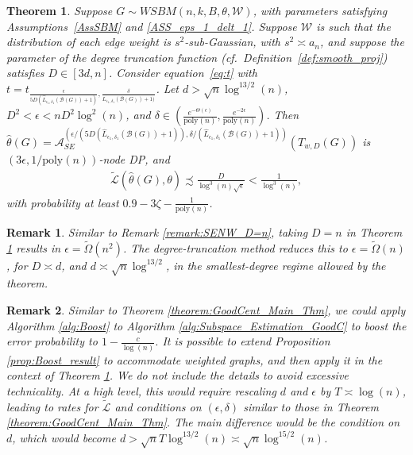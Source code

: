 \documentclass{article}
\newtheorem{remark}{Remark}
\newtheorem{theorem}{Theorem}
\newcommand{\thetahat}{\ensuremath{\widehat{\theta}}}
\begin{document}
\begin{theorem}
\label{theorem:GoodCent_Main_Thm_Weighted}
Suppose $G \sim WSBM(n, k, B, \theta, \mathscr{W})$, with parameters satisfying Assumptions~\ref{AssSBM} and \ref{ASS_eps_1_delt_1}. Suppose $\mathscr{W}$ is such that the distribution of each edge weight is $s^2$-sub-Gaussian, with $s^2 \asymp a_n$, and suppose the parameter of the degree truncation function (cf.\ Definition~\ref{def:smooth_proj}) satisfies $D \in [3d, n]$. Consider equation~\eqref{eq:t} with $t = t_{\frac{\epsilon}{5D(\hat{L}_{\epsilon_1, \delta_1}(\mathcal{B}(G)) + 1)}, \frac{\delta}{\hat{L}_{\epsilon_1, \delta_1}(\mathcal{B}(G)) + 1)}}$. Let $d > \sqrt{n}\log^{13/2}(n)$, $D^2 < \epsilon < nD^2\log^2(n)$, and $\delta \in \left(\frac{e^{-\Theta(\epsilon)}}{\mathrm{poly}(n)}, \frac{e^{-2\epsilon}}{\mathrm{poly}(n)}\right)$. Then $\thetahat(G) = \mathcal{A}_{SE}^{(\epsilon/(5D(\hat{L}_{\epsilon_1, \delta_1}(\mathcal{B}(G)) + 1)), \delta/(\hat{L}_{\epsilon_1, \delta_1}(\mathcal{B}(G)) + 1))}(T_{w,D}(G))$ is $(3\epsilon, 1/\mathrm{poly}(n))$-node DP, and
\begin{align*}
\widetilde{\mathcal{L}}\left(\thetahat(G), \theta\right) \precsim \frac{D}{\log^3(n)\sqrt{\epsilon}} < \frac{1}{\log^3(n)},
\end{align*}
with probability at least $0.9 - 3\zeta - \frac{1}{\mathrm{poly}(n)}$.
\end{theorem}

\begin{remark}
\label{remark:SEW_D=n}
Similar to Remark \ref{remark:SENW_D=n}, taking $D = n$ in Theorem \ref{theorem:GoodCent_Main_Thm_Weighted} results in $\epsilon = \widetilde{\Omega}(n^2)$. The degree-truncation method reduces this to $\epsilon = \widetilde{\Omega}(n)$, for $D \asymp d$, and $d \asymp \sqrt{n}\log^{13/2}$, in the smallest-degree regime allowed by the theorem.
\end{remark}

\begin{remark}
\label{remark:weighted_boost}
Similar to Theorem \ref{theorem:GoodCent_Main_Thm}, we could apply Algorithm \ref{alg:Boost} to Algorithm \ref{alg:Subspace_Estimation_GoodC} to boost the error probability to $1 - \frac{c}{\log(n)}$. It is possible to extend Proposition \ref{prop:Boost_result} to accommodate weighted graphs, and then apply it in the context of Theorem \ref{theorem:GoodCent_Main_Thm_Weighted}. We do not include the details to avoid excessive technicality. At a high level, this would require rescaling $d$ and $\epsilon$ by $T \asymp \log(n)$, leading to rates for $\widetilde{\mathcal{L}}$ and conditions on $(\epsilon,\delta)$ similar to those in Theorem \ref{theorem:GoodCent_Main_Thm}. The main difference would be the condition on $d$, which would become $d > \sqrt{n}T\log^{13/2}(n) \asymp \sqrt{n}\log^{15/2}(n)$.
\end{remark}
\end{document}
